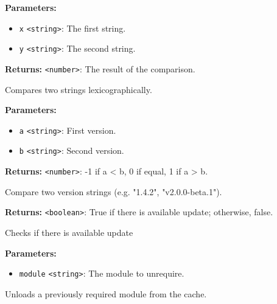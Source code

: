 \documentclass[12pt,a4paper]{article}
\begin{document}
\noindent \textbf{Parameters:}
\begin{itemize}
  \item \texttt{x} \texttt{<string>}: The first string.
  \item \texttt{y} \texttt{<string>}: The second string.
\end{itemize}

\noindent \textbf{Returns:} \texttt{<number>}: The result of the comparison.

\noindent Compares two strings lexicographically.

\vspace{5mm}
\noindent {}


\noindent \textbf{Parameters:}
\begin{itemize}
  \item \texttt{a} \texttt{<string>}: First version.
  \item \texttt{b} \texttt{<string>}: Second version.
\end{itemize}

\noindent \textbf{Returns:} \texttt{<number>}: -1 if a < b, 0 if equal, 1 if a > b.

\noindent Compare two version strings (e.g. "1.4.2", "v2.0.0-beta.1").

\vspace{5mm}
\noindent {}


\noindent \textbf{Returns:} \texttt{<boolean>}: True if there is available update; otherwise, false.

\noindent Checks if there is available update

\vspace{5mm}
\noindent {}


\noindent \textbf{Parameters:}
\begin{itemize}
  \item \texttt{module} \texttt{<string>}: The module to unrequire.
\end{itemize}

\noindent Unloads a previously required module from the cache.
\end{document}
